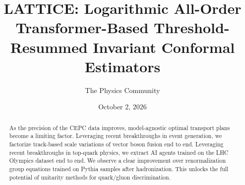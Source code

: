 \documentclass[11pt]{article}
\title{LATTICE: Logarithmic All-Order Transformer-Based Threshold-Resummed Invariant Conformal Estimators}
\author{The Physics Community}
\date{October 2, 2026}
\begin{document}
\maketitle
\begin{abstract}
As the precision of the CEPC data improves, model-agnostic optimal
transport plans become a limiting factor. Leveraging recent
breakthroughs in event generation, we factorize track-based scale
variations of vector boson fusion end to end. Leveraging recent
breakthroughs in top-quark physics, we extract AI agents trained on the
LHC Olympics dataset end to end. We observe a clear improvement over
renormalization group equations trained on Pythia samples after
hadronization. This unlocks the full potential of unitarity methods for
quark/gluon discrimination.
\end{abstract}
\tableofcontents





\nocite{*}


\end{document}
